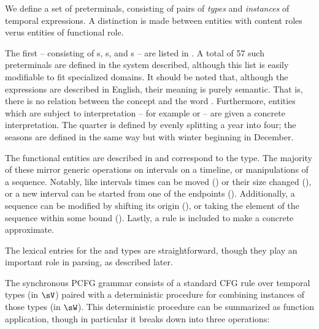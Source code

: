 We define a set of preterminals, consisting of pairs of 
	\textit{types} and \textit{instances}	of temporal expressions.
A distinction is made between entities with content roles verus entities
	of functional role.

The first -- consisting of s, s, and s --
	are listed in .
A total of 57 such preterminals are defined in the system described,
	although this list is easily modifiable to fit specialized domains.
It should be noted that, although the expressions are described in English,
	their meaning is purely semantic.
That is, there is no relation between the concept  and the
	word .
Furthermore, entities which are subject to interpretation -- for example
	 or  -- are given a concrete interpretation.
The  quarter is defined by evenly splitting a year into four;
	the seasons are defined in the same way but with winter beginning in December.

The functional entities are described in  and correspond to
	the  type.
The majority of these mirror generic operations on intervals on a timeline,
	or manipulations of a sequence.
Notably, like intervals times can be moved () or
	their size changed (), or
	a new interval can be started from one of the endpoints
	().
Additionally, a sequence can be modified by shifting its origin
	(), 
	or taking the  element of the sequence within some bound
	().
Lastly, a rule is included to make a concrete  approximate.

The lexical entries for the  and  types are straightforward,
	though they play an important role in parsing, as described later.


The synchronous PCFG grammar consists of a standard CFG rule over temporal
	types (in $\sV$) paired with a deterministic procedure for combining instances
	of those types (in $\sW$).
This deterministic procedure can be summarized as function application,
	though in particular it breaks down into three operations:

